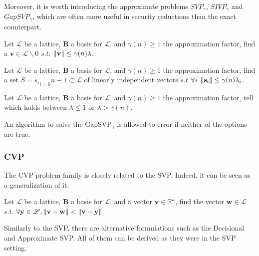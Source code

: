 Moreover, it is worth introducing the approximate problems $SVP_\gamma$, $SIVP_\gamma$ and $GapSVP_\gamma$, which are often more useful in security reductions than the exact counterpart.

\begin{definition}
Let $\mathscr{L}$ be a lattice, $\mathbf{B}$ a basis for $\mathscr{L}$, and $\gamma(n)\geq1$ the approximation factor, find a $\mathbf{v}\in\mathscr{L}\backslash0$ $s.t.$ $\left\lVert \mathbf{v} \right\rVert \leq \gamma(n)\lambda$.
\end{definition}

\begin{definition}
Let $\mathscr{L}$ be a lattice, $\mathbf{B}$ a basis for $\mathscr{L}$, and $\gamma(n)\geq1$ the approximation factor, find a set $S={s_i}_{i=0}{n-1}\subset \mathscr{L}$ of linearly independent vectors $s.t$ $\forall i$ $\left\lVert \mathbf{s_i} \right\rVert \leq \gamma(n)\lambda_i$.
\end{definition}

\begin{definition}
Let $\mathscr{L}$ be a lattice, $\mathbf{B}$ a basis for $\mathscr{L}$, and $\gamma(n)\geq1$ the approximation factor, tell which holds between $\lambda\leq1$ or $\lambda > \gamma(n)$.
\end{definition}
\begin{remark}
An algorithm to solve the GapSVP$_\gamma$ is allowed to error if neither of the options are true.
\end{remark}

\subsubsection{CVP}
The CVP problem family is closely related to the SVP. Indeed, it can be seen as a generalization of it.

\begin{definition}
Let $\mathscr{L}$ be a lattice, $\mathbf{B}$ a basis for $\mathscr{L}$, and a vector $\mathbf{v}\in\mathscr{\mathbb{R}^n}$, find the vector $\mathbf{w}\in\mathscr{L}$ $s.t.$ $\forall\mathbf{y}\in\mathscr{L},\left\lVert \mathbf{v}-\mathbf{w} \right\rVert < \left\lVert \mathbf{v}-\mathbf{y} \right\rVert$.
\end{definition}

Similarly to the SVP, there are alternative formulations such as the Decisional and Approximate SVP. All of them can be derived as they were in the SVP setting.

